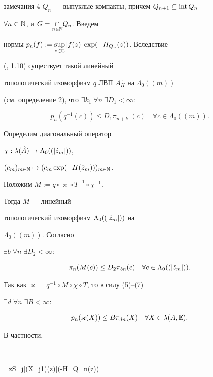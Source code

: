 замечания 4 $Q_n$ --- выпуклые компакты, причем $Q_{n+1}\subseteq\operatorname{int} Q_n$ 


$\forall n\in\Bbb N$, и $G=\underset{n\in\Bbb N}{\cap}Q_n$. Введем 


нормы $p_n(f):=\sup\limits_{z\in\Bbb C}|f(z)|\exp(-H_{Q_n}(z))$. Вследствие 


(\cite{Kor3}, 1.10) существует такой линейный 


топологический изоморфизм $q$ ЛВП $A^\circ_H$ на $\Lambda_0((m))$ 


(см. определение 2), что $\exists k_1\;\forall n\;\exists D_1<\infty :$ 


\begin{equation} 


p_n(q^{-1}(c))\le D_1\pi_{n+k_1}(c)\quad \forall c\in\Lambda_0((m)). 


\end{equation} 


Определим диагональный оператор 


$\chi:\lambda(\Hat A)\to\Lambda_0((|\Hat z_m|))$, 


$(c_m)_{m\in\Bbb N}\mapsto(c_m\exp(-H(\Hat z_m)))_{m\in\Bbb N}$. 


Положим $M:=q\circ\varkappa\circ T^{-1}\circ\chi^{-1}$. 


Тогда $M$ --- линейный 


топологический изоморфизм $\Lambda_0((|\Hat z_m|))$ на 


$\Lambda_0((m))$. Согласно \cite{Dub}


$\exists b\; \forall n\;\exists D_2<\infty :$ 


\begin{equation} 


\pi_n(M(c))\le D_2\pi_{bn}(c)\quad \forall c\in \Lambda_0((|\Hat z_m|)). 


\end{equation} 


Так как $\varkappa=q^{-1}\circ M\circ\chi\circ T$, то в силу (5)--(7) 


$\exists d\;\forall n\;\exists B<\infty :$ 


$$ 


p_n(\varkappa(X))\le B\pi_{dn}(X)\quad \forall X\in\lambda(A,\Bbb E). 


$$ 


В частности, 


$$ 


\sup_{z\in S_j}|\varkappa(X_{j1})(z)|\exp(-H_{Q_n}(z))\le 


